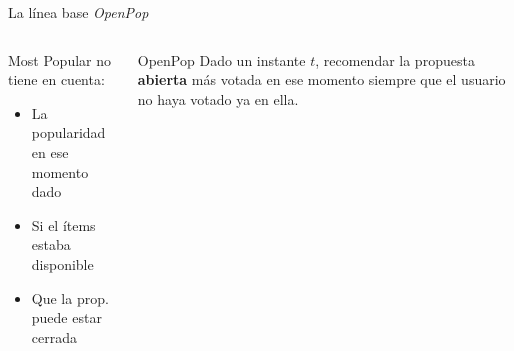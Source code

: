\begin{frame}{La línea base \textit{OpenPop}}
\begin{columns}
    \begin{alertblock}{Most Popular no tiene en cuenta:}
    \begin{itemize}
        \item La popularidad en ese momento dado
        \item Si el ítems estaba disponible
        \item Que la prop. puede estar cerrada
    \end{itemize}
    \end{alertblock}
    \pause
    \begin{exampleblock}{OpenPop}
        Dado un instante $t$, recomendar la propuesta \textbf{abierta} más votada en ese momento siempre que el usuario no haya votado ya en ella.
    \end{exampleblock}
\end{columns}

\end{frame}
